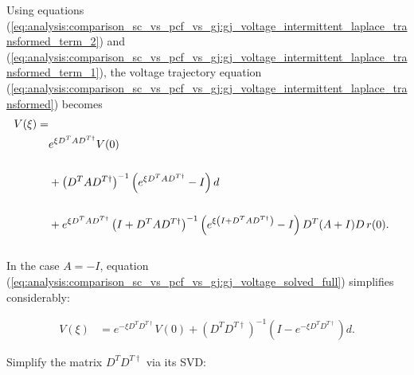 Using equations (\ref{eq:analysis:comparison_sc_vs_pcf_vs_gj:gj_voltage_intermittent_laplace_transformed_term_2}) and (\ref{eq:analysis:comparison_sc_vs_pcf_vs_gj:gj_voltage_intermittent_laplace_transformed_term_1}), the voltage trajectory equation (\ref{eq:analysis:comparison_sc_vs_pcf_vs_gj:gj_voltage_intermittent_laplace_transformed}) becomes 
\begin{align}
	\label{eq:analysis:comparison_sc_vs_pcf_vs_gj:gj_voltage_solved_full}
	V(\xi)
	= \notag \\ \notag
	& e^{\xi D^T A D^{T \dagger}} V(0)
	\\ \notag
	\\ &+ 
	\left(
		D^T A D^{T \dagger}
	\right)^{-1}
	\left(
		e^{\xi D^T A D^{T \dagger}} - I
	\right)
	d
	\\ \notag
	\\&+ \notag
	e^{\xi D^T A D^{T \dagger}}
	\left( I + D^T A D^{T \dagger} \right)^{-1}
	\left(
		e^{\xi \left( I + D^T A D^{T \dagger} \right)} - I
	\right)
	D^T(A + I)D \, r(0).
\end{align}
\\
In the case $A = -I$, equation (\ref{eq:analysis:comparison_sc_vs_pcf_vs_gj:gj_voltage_solved_full}) simplifies considerably:

\begin{align}	
\label{eq:analysis:comparison_sc_vs_pcf_vs_gj:gj_voltage_solved_simple}
	V(\xi)
	&=
	 e^{-\xi D^T D^{T \dagger}} V(0)
	+
	\left(
		D^T D^{T \dagger}
	\right)^{-1}
	\left(
		I - e^{-\xi D^T D^{T \dagger}}
	\right)
	d.
\end{align}

Simplify the matrix $D^T D^{T \dagger}$ via its SVD:

